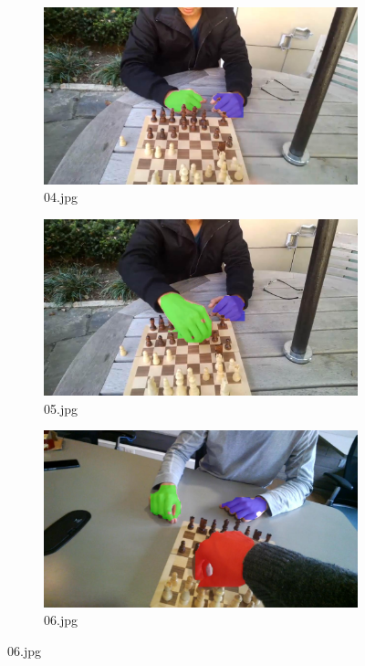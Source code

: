 \begin{figure}[!h]
\begin{subfigure}[b]{0.3\textwidth}
    \end{subfigure}

    \begin{subfigure}[b]{0.3 \textwidth}
        \centering
        \includegraphics[width=\textwidth]{images/handSegmentation/04.jpg}
        \caption{04.jpg}
       
    \end{subfigure}
    \hfill
    \begin{subfigure}[b]{0.3\textwidth}
        \centering
        \includegraphics[width=\textwidth]{images/handSegmentation/05.jpg}
        \caption{05.jpg}
        
    \end{subfigure}
    \hfill
    \begin{subfigure}[b]{0.3\textwidth}
        \centering
        \includegraphics[width=\textwidth]{images/handSegmentation/06.jpg}
        \caption{06.jpg}
        

\end{subfigure}
\end{figure}
